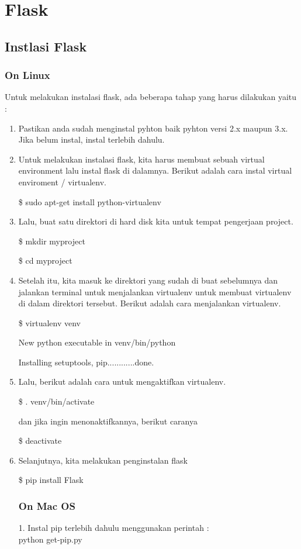 \documentclass[12pt,a4paper]{article}
\begin{document}
\section{Flask}
\subsection{Instlasi Flask}
\subsubsection{On Linux}
Untuk melakukan instalasi flask, ada beberapa tahap yang harus dilakukan yaitu :
\begin{enumerate}
\item Pastikan anda sudah menginstal pyhton baik pyhton versi 2.x maupun 3.x. Jika belum instal, instal terlebih dahulu.

\item Untuk melakukan instalasi flask, kita harus membuat sebuah virtual environment lalu instal flask di dalamnya. Berikut adalah cara instal virtual enviroment / virtualenv.

\$ sudo apt-get install python-virtualenv

\item Lalu, buat satu direktori di hard disk kita untuk tempat pengerjaan project. 

\$ mkdir myproject

\$ cd myproject

\item Setelah itu, kita masuk ke direktori yang sudah di buat sebelumnya dan jalankan terminal untuk menjalankan virtualenv untuk membuat virtualenv di dalam direktori tersebut. Berikut adalah cara menjalankan virtualenv.

\$ virtualenv venv

New python executable in venv/bin/python

Installing setuptools, pip............done.

\item Lalu, berikut adalah cara untuk mengaktifkan virtualenv.

\$ . venv/bin/activate 

dan jika ingin menonaktifkannya, berikut caranya 

\$ deactivate

\item Selanjutnya, kita melakukan penginstalan flask

\$ pip install Flask
\subsubsection{On Mac OS}
1. Instal pip terlebih dahulu menggunakan perintah :\\
	python get-pip.py\\


\end{enumerate}
\end{document}

